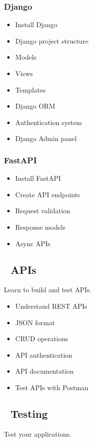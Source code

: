 \documentclass{article}
\begin{document}
\subsubsection*{Django}
\begin{itemize}[label=$\square$]
    \item Install Django
    \item Django project structure
    \item Models
    \item Views
    \item Templates
    \item Django ORM
    \item Authentication system
    \item Django Admin panel
\end{itemize}

\subsubsection*{FastAPI}
\begin{itemize}[label=$\square$]
    \item Install FastAPI
    \item Create API endpoints
    \item Request validation
    \item Response models
    \item Async APIs
\end{itemize}

\subsection*{🔌 APIs}
Learn to build and test APIs.

\begin{itemize}[label=$\square$]
    \item Understand REST APIs
    \item JSON format
    \item CRUD operations
    \item API authentication
    \item API documentation
    \item Test APIs with Postman
\end{itemize}

\subsection*{🧪 Testing}
Test your applications.
\end{document}
